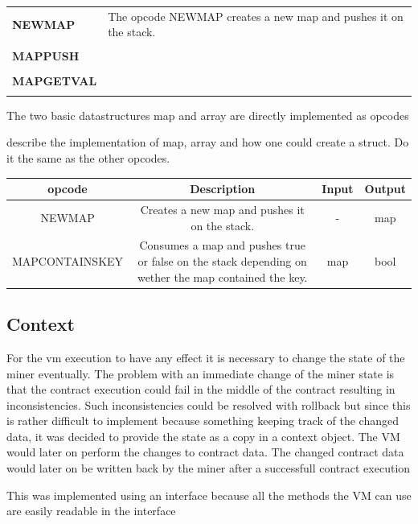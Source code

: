 \begin{tabular}[t]{ p{3cm} p{12.5cm}}
\textbf{NEWMAP} & 
The opcode NEWMAP creates a new map and pushes it on the stack. 
\\ \\

\textbf{MAPPUSH} & 
\\ \\

\textbf{MAPGETVAL} & 
\\ \\

\end{tabular}

The two basic datastructures map and array are directly implemented as opcodes

describe the implementation of map, array and how one could create a struct. Do it the same as the other opcodes.

\begin{tabular}[t]{ | c | c | c | c | }
\textbf{opcode} &
\textbf{Description} &
\textbf{Input} &
\textbf{Output} \\ \hline

NEWMAP &
Creates a new map and pushes it on the stack. &
- &
map \\ \hline

MAPCONTAINSKEY &
Consumes a map and pushes true or false on the stack depending on wether the map contained the key. &
map &
bool \\ \hline

\end{tabular}

\subsection{Context}
For the vm execution to have any effect it is necessary to change the state of the miner eventually. The problem with an immediate change of the miner state is that the contract execution could fail in the middle of the contract resulting in inconsistencies. Such inconsistencies could be resolved with rollback but since this is rather difficult to implement because something keeping track of the changed data, it was decided to provide the state as a copy in a context object. The VM would later on perform the changes to contract data. The changed contract data would later on be written back by the miner after a successfull contract execution


This was implemented using an interface because all the methods the VM can use are easily readable in the interface 

